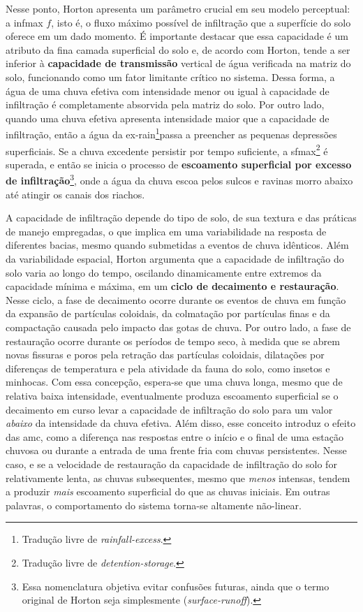 \documentclass[./main.tex]{subfiles}
\begin{document}
\par Nesse ponto, Horton apresenta um parâmetro crucial em seu modelo perceptual: a \gls{infmax} $f$, isto é, o fluxo máximo possível de infiltração que a superfície do solo oferece em um dado momento. É importante destacar que essa capacidade é um atributo da fina camada superficial do solo e, de acordo com Horton, tende a ser inferior à \textbf{capacidade de transmissão} vertical de água verificada na matriz do solo, funcionando como um fator limitante crítico no sistema. Dessa forma, a água de uma chuva efetiva com intensidade menor ou igual à capacidade de infiltração é completamente absorvida pela matriz do solo. Por outro lado, quando uma chuva efetiva apresenta intensidade maior que a capacidade de infiltração, então a água da \gls{ex-rain}\footnote{Tradução livre de \textit{rainfall-excess}.}passa a preencher as pequenas depressões superficiais. Se a chuva excedente persistir por tempo suficiente, a \gls{sfmax}\footnote{Tradução livre de \textit{detention-storage}.} é superada, e então se inicia o processo de \textbf{escoamento superficial por excesso de infiltração}\footnote{Essa nomenclatura objetiva evitar confusões futuras, ainda que o termo original de Horton seja simplesmente  (\textit{surface-runoff}).}, onde a água da chuva escoa pelos sulcos e ravinas morro abaixo até atingir os canais dos riachos. 

\par A capacidade de infiltração depende do tipo de solo, de sua textura e das práticas de manejo empregadas, o que implica em uma variabilidade na resposta de diferentes bacias, mesmo quando submetidas a eventos de chuva idênticos. Além da variabilidade espacial, Horton argumenta que a capacidade de infiltração do solo varia ao longo do tempo, oscilando dinamicamente entre extremos da capacidade mínima e máxima, em um \textbf{ciclo de decaimento e restauração}. Nesse ciclo, a fase de decaimento ocorre durante os eventos de chuva em função da expansão de partículas coloidais, da colmatação por partículas finas e da compactação causada pelo impacto das gotas de chuva. Por outro lado, a fase de restauração ocorre durante os períodos de tempo seco, à medida que se abrem novas fissuras e poros pela retração das partículas coloidais, dilatações por diferenças de temperatura e pela atividade da fauna do solo, como insetos e minhocas. Com essa concepção, espera-se que uma chuva longa, mesmo que de relativa baixa intensidade, eventualmente produza escoamento superficial se o decaimento em curso levar a capacidade de infiltração do solo para um valor \textit{abaixo} da intensidade da chuva efetiva. Além disso, esse conceito introduz o efeito das \gls{amc}, como a diferença nas respostas entre o início e o final de uma estação chuvosa ou durante a entrada de uma frente fria com chuvas persistentes. Nesse caso, e se a velocidade de restauração da capacidade de infiltração do solo for relativamente lenta, as chuvas subsequentes, mesmo que \textit{menos} intensas, tendem a produzir \textit{mais} escoamento superficial do que as chuvas iniciais. Em outras palavras, o comportamento do sistema torna-se altamente não-linear.
\end{document}
